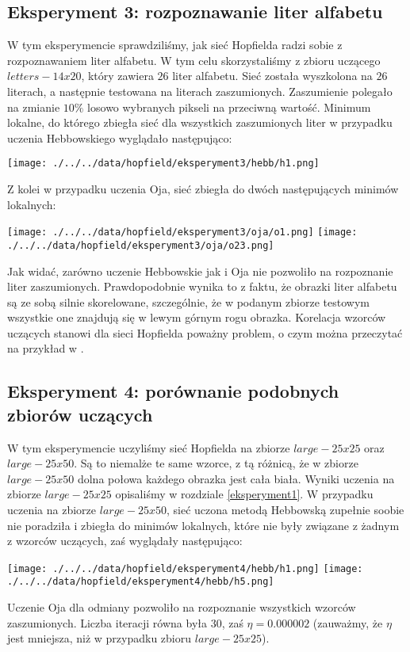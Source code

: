 \documentclass{article}
\begin{document}
\subsection{Eksperyment 3: rozpoznawanie liter alfabetu}
W tym eksperymencie sprawdziliśmy, jak sieć Hopfielda radzi sobie z rozpoznawaniem liter alfabetu.
W tym celu skorzystaliśmy z zbioru uczącego $letters-14x20$, który zawiera $26$ liter alfabetu.
Sieć została wyszkolona na $26$ literach, a następnie testowana na literach zaszumionych.
Zaszumienie polegało na zmianie $10\%$ losowo wybranych pikseli na przeciwną wartość.
Minimum lokalne, do którego zbiegła sieć dla wszystkich zaszumionych liter w przypadku uczenia 
Hebbowskiego wyglądało następująco:
\begin{center}
    \texttt{[image: ./../../data/hopfield/eksperyment3/hebb/h1.png]}
\end{center}
Z kolei w przypadku uczenia Oja, sieć zbiegła do dwóch następujących minimów lokalnych:
\begin{center}
    \texttt{[image: ./../../data/hopfield/eksperyment3/oja/o1.png]}
    \texttt{[image: ./../../data/hopfield/eksperyment3/oja/o23.png]}
\end{center}
Jak widać, zarówno uczenie Hebbowskie jak i Oja nie pozwoliło na rozpoznanie liter zaszumionych.
Prawdopodobnie wynika to z faktu, że obrazki liter alfabetu są ze sobą silnie skorelowane, 
szczególnie, że w podanym zbiorze testowym wszystkie one znajdują się w lewym górnym rogu obrazka.
Korelacja wzorców uczących stanowi dla sieci Hopfielda poważny problem, o czym można przeczytać na przykład
w \cite{ref1}.

\subsection{Eksperyment 4: porównanie podobnych zbiorów uczących}
W tym eksperymencie uczyliśmy sieć Hopfielda na zbiorze $large-25x25$ oraz $large-25x50$.
Są to niemalże te same wzorce, z tą różnicą, że w zbiorze $large-25x50$ dolna połowa każdego obrazka jest
cała biała. Wyniki uczenia na zbiorze $large-25x25$ opisaliśmy w rozdziale \ref{eksperyment1}.
W przypadku uczenia na zbiorze $large-25x50$, sieć uczona metodą Hebbowską zupełnie soobie nie poradziła
i zbiegła do minimów lokalnych, które nie były związane z żadnym z wzorców uczących, zaś wyglądały następująco:
\begin{center}
    \texttt{[image: ./../../data/hopfield/eksperyment4/hebb/h1.png]}
    \texttt{[image: ./../../data/hopfield/eksperyment4/hebb/h5.png]}
\end{center}
Uczenie Oja dla odmiany pozwoliło na rozpoznanie wszystkich wzorców zaszumionych.
Liczba iteracji równa była $30$, zaś $\eta = 0.000002$ (zauważmy, że $\eta$ jest mniejsza, niż w przypadku 
zbioru $large-25x25$).
\end{document}
